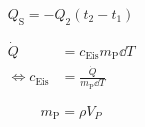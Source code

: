 \documentclass[a4paper]{scrartcl}
\begin{document}
	\begin{equation} %
		Q_\text{S} = -Q_2 (t_2 - t_1)
	\end{equation} %
	
	\begin{align}
		\dot{Q} &= c_\text{Eis} m_\text{P} \dd T\\
		\Leftrightarrow c_\text{Eis} &= \frac{\dot{Q}}{m_\text{P}\dd T}
	\end{align} %
	
	\begin{equation}
		m_\text{P} = \rho V_{P}
	\end{equation} %
\end{document}
